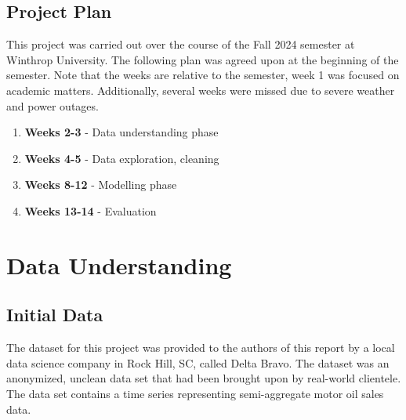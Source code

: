 \documentclass{article}
\begin{document}
    \subsection{Project Plan}
        This project was carried out over the course of the Fall 2024 semester at Winthrop
        University. The following plan was agreed upon at the beginning of the semester.
        Note that the weeks are relative to the semester, week 1 was focused on academic matters.
        Additionally, several weeks were missed due to severe weather and power outages.
        \begin{enumerate}
            \item \textbf{Weeks 2-3} - Data understanding phase
            \item \textbf{Weeks 4-5} - Data exploration, cleaning
            \item \textbf{Weeks 8-12} - Modelling phase
            \item \textbf{Weeks 13-14} - Evaluation
        \end{enumerate}


\section{Data Understanding}
    \subsection{Initial Data}
        The dataset for this project was provided to the authors of this report by a local
        data science company in Rock Hill, SC, called Delta Bravo. The dataset was an
        anonymized, unclean data set that had been brought upon by real-world clientele.
        The data set contains a time series representing semi-aggregate motor oil sales data.
\end{document}
